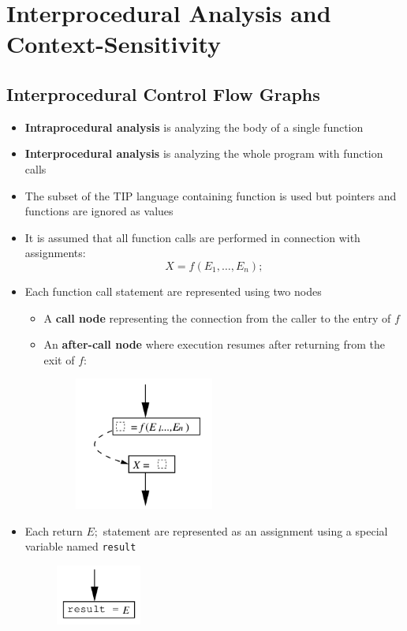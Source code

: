 \section{Interprocedural Analysis and Context-Sensitivity}
\subsection{Interprocedural Control Flow Graphs}
\begin{itemize}
  \item \textbf{Intraprocedural analysis} is analyzing the body of a single function
  \item \textbf{Interprocedural analysis} is analyzing the whole program with function calls
  \item The subset of the TIP language containing function is used but pointers and functions are ignored as values
  \item It is assumed that all function calls are performed in connection with assignments:
  \begin{equation*}
    X=f(E_1, \dots, E_n);
  \end{equation*}
  \item Each function call statement are represented using two nodes
  \begin{itemize}
  	\item A \textbf{call node} representing the connection from the caller to the entry of $f$
  	\item An \textbf{after-call node} where execution resumes after returning from the exit of $f$:
    \begin{figure}[H]
    	\centering
    	\includegraphics[width=130pt]{img/interprocedural/after_call_node}
    \end{figure}
  \end{itemize}
  \item Each $\text{return } E;$ statement are represented as an assignment using a special variable named \texttt{result}
    \begin{figure}[H]
    	\centering
    	\includegraphics[width=80pt]{img/interprocedural/result}

\end{figure}
\end{itemize}
